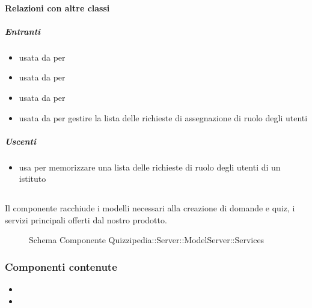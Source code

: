 \paragraph{Relazioni con altre classi}
\subparagraph{Entranti}
\begin{itemize}
\item usata da  per 
\item usata da  per 
\item usata da  per 
\item usata da  per gestire la lista delle richieste di assegnazione di ruolo degli utenti
\end{itemize}
\subparagraph{Uscenti}
\begin{itemize}
\item usa  per memorizzare una lista delle richieste di ruolo degli utenti di un istituto
\end{itemize}
\subsection{}
Il componente racchiude i modelli necessari alla creazione di domande e quiz, i servizi principali offerti dal nostro prodotto.
\begin{figure}[H]
\centering
\noindent{}
\caption[Schema Componente Quizzipedia::Server::ModelServer::Services]{Schema Componente Quizzipedia::Server::ModelServer::Services}
\end{figure}
\subsubsection{Componenti contenute}
\begin{itemize}
\item {}
\item {}
\end{itemize}
